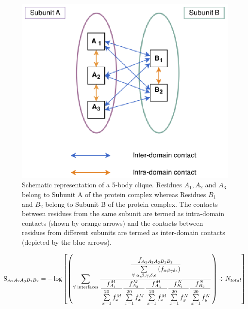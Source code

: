 \begin{figure}[hb]
	\centering
	\includegraphics{./methods/clique.eps}
	\caption[Schematic representation of a 5-body clique]{Schematic representation of a 5-body clique. Residues $A_1, A_2$ and $A_3$ belong to Subunit A of the protein complex whereas Residues $B_1$ and $B_2$ belong to Subunit B of the protein complex. The contacts between residues from the same subunit are termed as intra-domain contacts (shown by orange arrows) and the contacts between residues from different subunits are termed as inter-domain contacts (depicted by the blue arrows).}
	\label{clique}
\end{figure}

\vfill

\begingroup
\large
\begin{equation}
\mathrm{S}_{A_{1}A_{2}A_{3}B_{1}B_{2}} = -\log \left[ \left( \sum\limits_{\forall\; \mathrm{interfaces}} \dfrac{\dfrac{\vphantom{\frac{a}{b}} f_{A_{1}A_{2}A_{3}B_{1}B_{2}}}{\vphantom{\frac{a}{b}}\sum\limits_{\forall \; \alpha,\beta,\gamma,\delta,\epsilon} \;(f_{\alpha\beta\gamma\delta\epsilon})}}{\dfrac{\vphantom{\frac{a}{b}}f_{A_1}^M}{\vphantom{\frac{a}{b}}\sum\limits_{x = 1}^{20} f_{x}^M}\dfrac{\vphantom{\frac{a}{b}}f_{A_2}^M}{\vphantom{\frac{a}{b}}\sum\limits_{x = 1}^{20} f_{x}^M}\dfrac{\vphantom{\frac{a}{b}}f_{A_3}^M}{\vphantom{\frac{a}{b}}\sum\limits_{x = 1}^{20} f_{x}^M}\dfrac{\vphantom{\frac{a}{b}}f_{B_1}^N}{\vphantom{\frac{a}{b}}\sum\limits_{x = 1}^{20} f_{y}^N}\dfrac{\vphantom{\frac{a}{b}}f_{B_2}^N}{\vphantom{\frac{a}{b}}\sum\limits_{x = 1}^{20} f_{y}^N}} \right) \div N_{total} \right]
\label{mb_eqn}
\end{equation}
\endgroup


